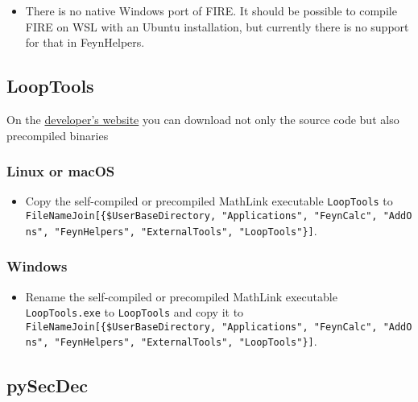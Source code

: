 \documentclass[../FeynHelpersManual.tex]{subfiles}
\begin{document}
\begin{itemize}
\tightlist
\item
  There is no native Windows port of FIRE. It should be possible to
  compile FIRE on WSL with an Ubuntu installation, but currently there
  is no support for that in FeynHelpers.
\end{itemize}

\hypertarget{looptools}{%
\subsection{LoopTools}\label{looptools}}

On the \href{http://www.feynarts.de/looptools/}{developer's website} you
can download not only the source code but also precompiled binaries

\hypertarget{linux-or-macos}{%
\subsubsection{Linux or macOS}\label{linux-or-macos}}

\begin{itemize}
\tightlist
\item
  Copy the self-compiled or precompiled MathLink executable
  \texttt{LoopTools} to
  \texttt{FileNameJoin[\allowbreak{}\{\allowbreak{}\$UserBaseDirectory,\ \allowbreak{}"Applications",\ \allowbreak{}"FeynCalc",\ \allowbreak{}"AddOns",\ \allowbreak{}"FeynHelpers",\ \allowbreak{}"ExternalTools",\ \allowbreak{}"LoopTools"\}]}.
\end{itemize}

\hypertarget{windows-2}{%
\subsubsection{Windows}\label{windows-2}}

\begin{itemize}
\tightlist
\item
  Rename the self-compiled or precompiled MathLink executable
  \texttt{LoopTools.exe} to \texttt{LoopTools} and copy it to
  \texttt{FileNameJoin[\allowbreak{}\{\allowbreak{}\$UserBaseDirectory,\ \allowbreak{}"Applications",\ \allowbreak{}"FeynCalc",\ \allowbreak{}"AddOns",\ \allowbreak{}"FeynHelpers",\ \allowbreak{}"ExternalTools",\ \allowbreak{}"LoopTools"\}]}.
\end{itemize}

\hypertarget{pysecdec}{%
\subsection{pySecDec}\label{pysecdec}}
\end{document}
